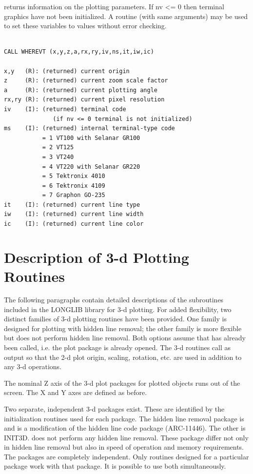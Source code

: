 \documentclass[11pt]{report}
\begin{document}
 returns information on the  plotting parameters.  If nv <= 0
then terminal graphics have not been initialized.  A routine
 (with same arguments) may be used to set these variables to 
 values without error checking.
\begin{verbatim}

CALL WHEREVT (x,y,z,a,rx,ry,iv,ns,it,iw,ic)

x,y   (R): (returned) current origin
z     (R): (returned) current zoom scale factor
a     (R): (returned) current plotting angle
rx,ry (R): (returned) current pixel resolution
iv    (I): (returned) terminal code
              (if nv <= 0 terminal is not initialized)
ms    (I): (returned) internal terminal-type code
           = 1 VT100 with Selanar GR100
           = 2 VT125 
           = 3 VT240 
           = 4 VT220 with Selanar GR220
           = 5 Tektronix 4010
           = 6 Tektronix 4109
           = 7 Graphon GO-235
it    (I): (returned) current line type 
iw    (I): (returned) current line width
ic    (I): (returned) current line color
\end{verbatim}

\chapter{Description of 3-d Plotting Routines}

The following paragraphs contain detailed descriptions of the
subroutines included in the LONGLIB library for 3-d plotting.  For
added flexibility, two distinct families of 3-d plotting routines have
been provided.  One family is designed for plotting with hidden line
removal; the other family is more flexible but does not perform hidden
line removal.  Both options assume that  has already been
called, i.e. the plot package is already opened.  The 3-d routines
call  as output so that the 2-d plot origin, scaling,
rotation, etc. are used in addition to any 3-d operations.

The nominal Z axis of the 3-d plot packages for plotted objects runs out
of the screen.  The X and Y axes are defined as before.

Two separate, independent  3-d packages exist.  These are identified by
the initialization routines used for each package.  The hidden line
removal package is  and is a modification of the  hidden
line code package (ARC-11446).  The other is INIT3D.   does
not perform any hidden line removal.  These package differ not only in
hidden line removal but also in speed of operation and memory requirements.
The packages are completely independent.  Only routines designed for a
particular package work with that package.  It is possible to
use both simultaneously.
\end{document}
